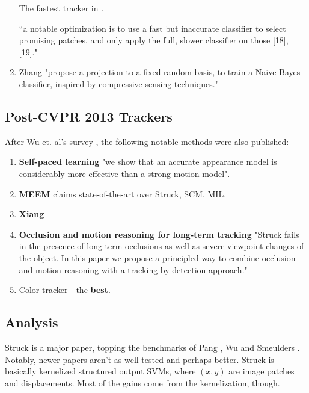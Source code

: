 \begin{enumerate}
The fastest tracker in \cite{wu2013online}.

``a notable optimization
is to use a fast but inaccurate classifier to select promising
patches, and only apply the full, slower classifier on those
[18], [19]."

 


\item Zhang \cite{zhang2012real} "propose a projection to a fixed
random basis, to train a Naive Bayes classifier, inspired
by compressive sensing techniques."
\end{enumerate}


\subsection{Post-CVPR 2013 Trackers}
After Wu et. al's  survey \cite{wu2013online}, the following notable methods were also published:

\begin{enumerate}
\item \textbf{Self-paced learning} \cite{supancic2013self} "we show that an accurate appearance model is considerably more effective than a strong motion model". 
\item \textbf{MEEM} \cite{zhang2014meem} claims state-of-the-art over Struck, SCM, MIL.
\item \textbf{Xiang} \cite{xiang2014monocular}
\item \textbf{Occlusion and motion reasoning for long-term tracking} \cite{hua2014occlusion} "Struck fails in
the presence of long-term occlusions as well as severe viewpoint changes
of the object. In this paper we propose a principled way to combine occlusion and motion reasoning with a tracking-by-detection approach."
\item Color tracker \cite{danelljan2014adaptive} - the \textbf{best}.
\end{enumerate}

\subsection{Analysis}
Struck is a major paper, topping the benchmarks of Pang \cite{pang2013finding}, Wu \cite{wu2013online} and Smeulders \cite{smeulders2013visual}. Notably, newer papers aren't as well-tested and perhaps better. Struck is basically kernelized structured output SVMs, where $(x,y)$ are image patches and displacements. Most of the gains come from the kernelization, though.

